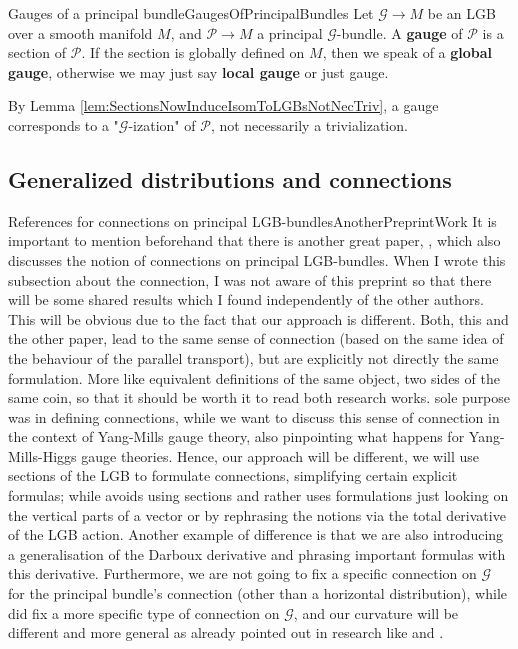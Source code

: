 \documentclass[a4paper,oneside,11pt,bibliography=totoc]{scrartcl}
\theoremstyle{plain}
\theoremstyle{remark}
\theoremstyle{definition}
\begin{document}
\begin{definitions}{Gauges of a principal bundle}{GaugesOfPrincipalBundles}
Let $\mathcal{G} \to M$ be an LGB over a smooth manifold $M$, and $\mathcal{P} \to M$ a principal $\mathcal{G}$-bundle. A \textbf{gauge} of $\mathcal{P}$ is a section of $\mathcal{P}$. If the section is globally defined on $M$, then we speak of a \textbf{global gauge}, otherwise we may just say \textbf{local gauge} or just gauge.
\end{definitions}

By Lemma \ref{lem:SectionsNowInduceIsomToLGBsNotNecTriv}, a gauge corresponds to a "$\mathcal{G}$-ization" of $\mathcal{P}$, not necessarily a trivialization.

\subsection{Generalized distributions and connections}\label{ConnectionSubsection}

\begin{remarks}{References for connections on principal LGB-bundles}{AnotherPreprintWork}
It is important to mention beforehand that there is another great paper, \cite{OtherPreprintAboutConnection}, which also discusses the notion of connections on principal LGB-bundles. When I wrote this subsection about the connection, I was not aware of this preprint so that there will be some shared results which I found independently of the other authors. This will be obvious due to the fact that our approach is different. Both, this and the other paper, lead to the same sense of connection (based on the same idea of the behaviour of the parallel transport), but are explicitly not directly the same formulation. More like equivalent definitions of the same object, two sides of the same coin, so that it should be worth it to read both research works. \cite{OtherPreprintAboutConnection} sole purpose was in defining connections, while we want to discuss this sense of connection in the context of Yang-Mills gauge theory, also pinpointing what happens for Yang-Mills-Higgs gauge theories. Hence, our approach will be different, we will use sections of the LGB to formulate connections, simplifying certain explicit formulas; while \cite{OtherPreprintAboutConnection} avoids using sections and rather uses formulations just looking on the vertical parts of a vector or by rephrasing the notions via the total derivative of the LGB action. Another example of difference is that we are also introducing a generalisation of the Darboux derivative and phrasing important formulas with this derivative. Furthermore, we are not going to fix a specific connection on $\mathcal{G}$ for the principal bundle's connection (other than a horizontal distribution), while \cite{OtherPreprintAboutConnection} did fix a more specific type of connection on $\mathcal{G}$, and our curvature will be different and more general as already pointed out in research like \cite{CurvedYMH} and \cite{MyThesis}.
\end{remarks}
\end{document}
